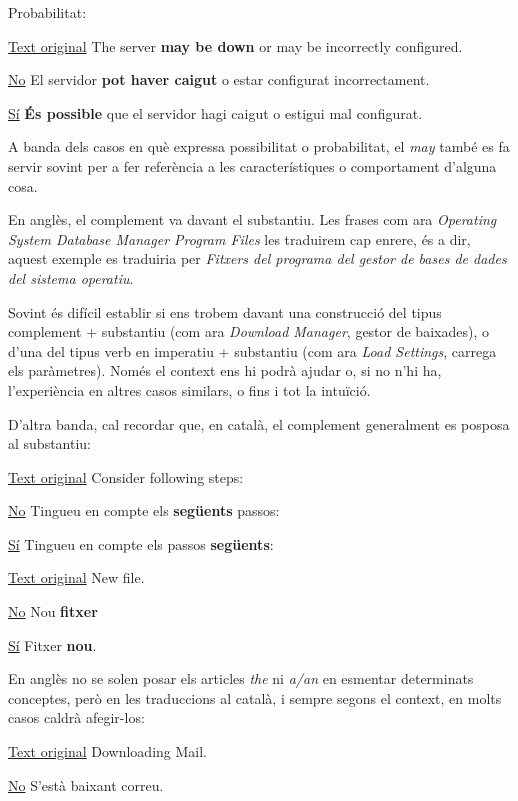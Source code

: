 \documentclass[9pt]{cheatsheet}
\begin{document}
\begin{multicols*}{3}
Probabilitat:

\underline {Text original} The server \textbf{may be down} or may be incorrectly configured.

\underline {No} El servidor \textbf{pot haver caigut} o estar configurat incorrectament.

\underline {Sí} \textbf{És possible} que el servidor hagi caigut o estigui mal configurat.

A banda dels casos en què expressa possibilitat o probabilitat, el \emph{may} també es fa servir sovint per a fer referència a les característiques o comportament d'alguna cosa.


En anglès, el complement va davant el substantiu. Les frases com ara \emph{Operating System Database Manager Program Files} les traduirem cap enrere, és a dir, aquest exemple es traduiria per \emph{Fitxers del programa del gestor de bases de dades del sistema operatiu}.

Sovint és difícil establir si ens trobem davant una construcció del tipus complement + substantiu (com ara \emph{Download Manager}, gestor de baixades), o d'una del tipus verb en imperatiu + substantiu (com ara \emph{Load Settings}, carrega els paràmetres). Només el context ens hi podrà ajudar o, si no n'hi ha, l'experiència en altres casos similars, o fins i tot la intuïció.

D'altra banda, cal recordar que, en català, el complement generalment es posposa al substantiu:

\underline {Text original} Consider following steps:

\underline {No} Tingueu en compte els \textbf{següents} passos:

\underline {Sí} Tingueu en compte els passos \textbf{següents}:


\underline {Text original} New file.

\underline {No} Nou \textbf{fitxer}

\underline {Sí} Fitxer \textbf{nou}.


En anglès no se solen posar els articles \emph{the} ni \emph{a/an} en esmentar determinats conceptes, però en les traduccions al català, i sempre segons el context, en molts casos caldrà afegir-los:

\underline {Text original} Downloading Mail.

\underline {No} S'està baixant correu.


\end{multicols*}
\end{document}

